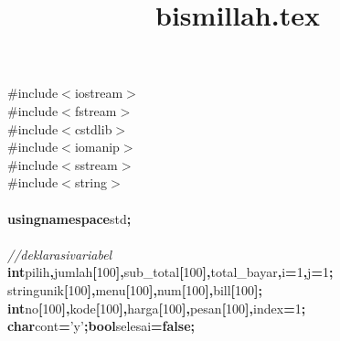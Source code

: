\documentclass[a4paper, 11pt]{article}
\title{bismillah.tex}
\newcommand\SPC{\hspace*{0.6em}}
\newcommand\TAB{\hspace*{1.2em}}
\newcommand{\CppACharacter}[1]{#1}
\newcommand{\CppAComment}[1]{\textit{\textcolor[rgb]{0,0.47,0.84}{#1}}}
\newcommand{\CppAIdentifier}[1]{#1}
\newcommand{\CppANumber}[1]{\textcolor[rgb]{0.5,0,0.5}{#1}}
\newcommand{\CppAPreprocessor}[1]{\textcolor[rgb]{0,0.5,0}{#1}}
\newcommand{\CppAReservedWord}[1]{\textbf{#1}}
\newcommand{\CppASpace}[1]{\colorbox[rgb]{1,1,1}{#1}}
\newcommand{\CppASymbol}[1]{\textbf{\textcolor[rgb]{1,0,0}{#1}}}
\begin{document}
\begin{ttfamily}
\noindent
\CppAPreprocessor{\#include\SPC $<$iostream$>$}\\
\CppAPreprocessor{\#include\SPC $<$fstream$>$}\\
\CppAPreprocessor{\#include\SPC $<$cstdlib$>$}\\
\CppAPreprocessor{\#include\SPC $<$iomanip$>$}\\
\CppAPreprocessor{\#include\SPC $<$sstream$>$}\\
\CppAPreprocessor{\#include\SPC $<$string$>$}\\
\\
\CppAReservedWord{using}\CppASpace{\SPC }\CppAReservedWord{namespace}\CppASpace{\SPC }\CppAIdentifier{std}\CppASymbol{;}\\
\\
\CppASpace{\TAB }\CppAComment{//deklarasi\SPC variabel}\\
\CppASpace{\TAB }\CppAReservedWord{int}\CppASpace{\SPC }\CppAIdentifier{pilih}\CppASymbol{,}\CppASpace{\SPC }\CppAIdentifier{jumlah}\CppASymbol{[}\CppANumber{100}\CppASymbol{]}\CppASymbol{,}\CppASpace{\SPC }\CppAIdentifier{sub\_total}\CppASymbol{[}\CppANumber{100}\CppASymbol{]}\CppASymbol{,}\CppASpace{\SPC }\CppAIdentifier{total\_bayar}\CppASymbol{,}\CppASpace{\SPC }\CppAIdentifier{i}\CppASymbol{=}\CppANumber{1}\CppASymbol{,}\CppASpace{\SPC }\CppAIdentifier{j}\CppASymbol{=}\CppANumber{1}\CppASymbol{;}\\
\CppASpace{\TAB }\CppAIdentifier{string}\CppASpace{\SPC }\CppAIdentifier{unik}\CppASymbol{[}\CppANumber{100}\CppASymbol{]}\CppASymbol{,}\CppASpace{\SPC }\CppAIdentifier{menu}\CppASymbol{[}\CppANumber{100}\CppASymbol{]}\CppASymbol{,}\CppASpace{\SPC }\CppAIdentifier{num}\CppASymbol{[}\CppANumber{100}\CppASymbol{]}\CppASymbol{,}\CppASpace{\SPC }\CppAIdentifier{bill}\CppASymbol{[}\CppANumber{100}\CppASymbol{]}\CppASymbol{;}\\
\CppASpace{\TAB }\CppAReservedWord{int}\CppASpace{\SPC }\CppAIdentifier{no}\CppASymbol{[}\CppANumber{100}\CppASymbol{]}\CppASymbol{,}\CppAIdentifier{kode}\CppASymbol{[}\CppANumber{100}\CppASymbol{]}\CppASymbol{,}\CppASpace{\SPC }\CppAIdentifier{harga}\CppASymbol{[}\CppANumber{100}\CppASymbol{]}\CppASymbol{,}\CppASpace{\SPC }\CppAIdentifier{pesan}\CppASymbol{[}\CppANumber{100}\CppASymbol{]}\CppASymbol{,}\CppASpace{\SPC }\CppAIdentifier{index}\CppASymbol{=}\CppANumber{1}\CppASymbol{;}\\
\CppASpace{\TAB }\CppAReservedWord{char}\CppASpace{\SPC }\CppAIdentifier{cont}\CppASpace{\SPC }\CppASymbol{=}\CppASpace{\SPC }\CppACharacter{'y'}\CppASymbol{;}\CppASpace{\SPC }\CppAReservedWord{bool}\CppASpace{\SPC }\CppAIdentifier{selesai}\CppASymbol{=}\CppAReservedWord{false}\CppASymbol{;}\\

\end{ttfamily}
\end{document}
